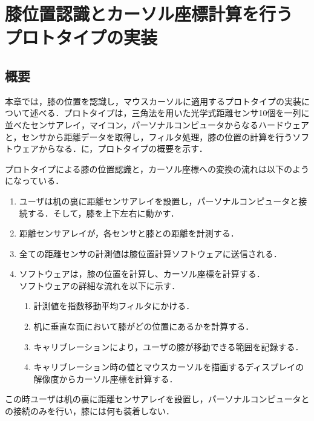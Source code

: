 \chapter{膝位置認識とカーソル座標計算を行う\\プロトタイプの実装}
\section{概要}
本章では，膝の位置を認識し，マウスカーソルに適用するプロトタイプの実装について述べる．プロトタイプは，三角法を用いた光学式距離センサ10個を一列に並べたセンサアレイ，マイコン，パーソナルコンピュータからなるハードウェアと，センサから距離データを取得し，フィルタ処理，膝の位置の計算を行うソフトウェアからなる．に，プロトタイプの概要を示す．

プロトタイプによる膝の位置認識と，カーソル座標への変換の流れは以下のようになっている．
\begin{enumerate}
	\item ユーザは机の裏に距離センサアレイを設置し，パーソナルコンピュータと接続する．そして，膝を上下左右に動かす．
	\item 距離センサアレイが，各センサと膝との距離を計測する．
	\item 全ての距離センサの計測値は膝位置計算ソフトウェアに送信される．
	\item ソフトウェアは，膝の位置を計算し、カーソル座標を計算する．\\ソフトウェアの詳細な流れを以下に示す．
	\begin{enumerate}
		\item 計測値を指数移動平均フィルタにかける．
		\item 机に垂直な面において膝がどの位置にあるかを計算する．
		\item キャリブレーションにより，ユーザの膝が移動できる範囲を記録する．
		\item キャリブレーション時の値とマウスカーソルを描画するディスプレイの解像度からカーソル座標を計算する．
	\end{enumerate}
\end{enumerate}
この時ユーザは机の裏に距離センサアレイを設置し，パーソナルコンピュータとの接続のみを行い，膝には何も装着しない．

